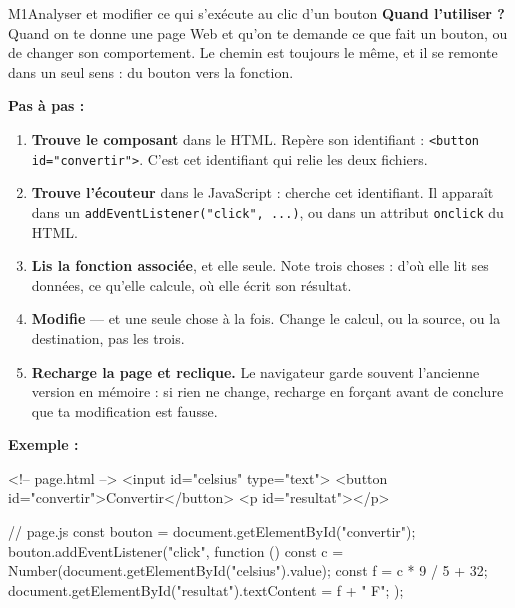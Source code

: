 \begin{fichemethode}{M1}{Analyser et modifier ce qui s'exécute au clic d'un bouton}
\textbf{Quand l'utiliser ?} Quand on te donne une page Web et qu'on te demande ce que fait
un bouton, ou de changer son comportement. Le chemin est toujours le même, et il se remonte
dans un seul sens : du bouton vers la fonction.

\textbf{Pas à pas :}
\begin{enumerate}
  \item \textbf{Trouve le composant} dans le HTML. Repère son identifiant :
    \lstinline{<button id="convertir">}. C'est cet identifiant qui relie les deux fichiers.
  \item \textbf{Trouve l'écouteur} dans le JavaScript : cherche cet identifiant. Il apparaît
    dans un \lstinline{addEventListener("click", ...)}, ou dans un attribut
    \lstinline{onclick} du HTML.
  \item \textbf{Lis la fonction associée}, et elle seule. Note trois choses : d'où elle lit
    ses données, ce qu'elle calcule, où elle écrit son résultat.
  \item \textbf{Modifie} — et une seule chose à la fois. Change le calcul, ou la source, ou
    la destination, pas les trois.
  \item \textbf{Recharge la page et reclique.} Le navigateur garde souvent l'ancienne version
    en mémoire : si rien ne change, recharge en forçant avant de conclure que ta
    modification est fausse.
\end{enumerate}

\textbf{Exemple :}

\begin{console}
<!-- page.html -->
<input id="celsius" type="text">
<button id="convertir">Convertir</button>
<p id="resultat"></p>
\end{console}

\begin{console}
// page.js
const bouton = document.getElementById("convertir");
bouton.addEventListener("click", function () {
    const c = Number(document.getElementById("celsius").value);
    const f = c * 9 / 5 + 32;
    document.getElementById("resultat").textContent = f + " F";
});
\end{console}


\end{fichemethode}
